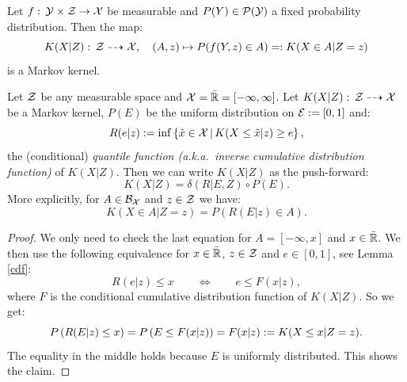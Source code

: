 \begin{Rem}\label{rem:Markov_kernel_from_family_of_distributions}
    Let $f:\, \mathcal{Y} \times \mathcal{Z} \to \mathcal{X}$ be measurable
    and $P(Y) \in \mathcal{P}(\mathcal{Y})$ a fixed probability distribution.
    Then the map:
    \[ K(X|Z):\,\mathcal{Z} \dashrightarrow \mathcal{X},\quad (A,z) \mapsto P(f(Y,z) \in A)=:K(X \in A|Z=z)  \]
    is a Markov kernel.
\end{Rem}

\begin{Thm}\label{mk-uniform}
  Let $\mathcal{Z}$ be any measurable space and $\mathcal{X}=\bar{\mathbb{R}}=[-\infty,\infty]$.
    Let $K(X|Z):\, \mathcal{Z} \dasharrow \mathcal{X}$ be a Markov kernel, $P(E)$ be the uniform distribution on $\mathcal{E}:=[0,1]$ and:
    \[ 	R(e|z) := \inf \left \{ \tilde{x} \in \mathcal{X} \,\middle|\, K(X \le \tilde{x}|z) \ge e \right \},\]
    the (conditional) \emph{quantile function (a.k.a.\ inverse cumulative distribution function)} of $K(X|Z)$.
    Then we can write $K(X|Z)$ as the push-forward:
    \[ K(X|Z) = \delta(R|E,Z) \circ P(E).\]
More explicitly, for $A \in \mathcal{B}_{\mathcal{X}}$ and $z \in \mathcal{Z}$ we have:
\[ K(X \in A|Z=z) = P(R(E|z) \in A).  \]
\begin{proof} %
    We only need to check the last equation for $A=[-\infty,x]$ and $x \in \bar {\mathbb{R}}$. 
    We then use the following equivalence for $x \in \bar {\mathbb{R}}$, $z \in \mathcal{Z}$ and $e \in [0,1]$, see Lemma \ref{cdf}:
    \[ R(e|z) \le x \qquad \iff \qquad e \le F(x|z),  \]
    where $F$ is the conditional cumulative distribution function of $K(X|Z)$. So we get:
    \[P\left ( R(E|z) \le x \right ) = P\left ( E \le F(x|z) \right ) = F(x|z) := K(X \le x|Z=z).    \]
    The equality in the middle holds because $E$ is uniformly distributed.
    This shows the claim.
\end{proof}
\end{Thm}

